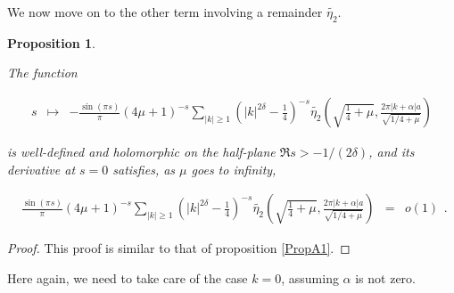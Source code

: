\documentclass{jams-l}
\newtheorem{proposition}[theorem]{Proposition}
\theoremstyle{definition}
\theoremstyle{remark}
\numberwithin{equation}{section}
\begin{document}
            We now move on to the other term involving a remainder $\widetilde{\eta_2}$.
            
            \begin{proposition}
            \label{PropA2}
            
                The function
                
                \[ \begin{array}{lll}
                        s & \longmapsto & - \frac{\sin \left( \pi s \right)}{\pi} \left( 4 \mu + 1 \right)^{-s} \sum\limits_{\left \vert k \right \vert \geqslant 1} \left( \left \vert k \right \vert^{2 \delta} - \frac{1}{4} \right)^{-s} \widetilde{\eta_2} \left( \sqrt{\frac{1}{4} + \mu}, \frac{2 \pi \left \vert k + \alpha \right \vert a}{\sqrt{1/4 + \mu}} \right)
                    \end{array} \]
                
                \noindent is well-defined and holomorphic on the half-plane $\Re s > - 1 / \left( 2 \delta \right)$, and its derivative at $s=0$ satisfies, as $\mu$ goes to infinity,
                
                \[ \begin{array}{lll}
                        \frac{\sin \left( \pi s \right)}{\pi} \left( 4 \mu + 1 \right)^{-s} \sum\limits_{\left \vert k \right \vert \geqslant 1} \left( \left \vert k \right \vert^{2 \delta} - \frac{1}{4} \right)^{-s} \widetilde{\eta_2} \left( \sqrt{\frac{1}{4} + \mu}, \frac{2 \pi \left \vert k + \alpha \right \vert a}{\sqrt{1/4 + \mu}} \right) & = & o \left( 1 \right)
                    \end{array} . \]
            
            \end{proposition}
            
            \begin{proof}
            
                This proof is similar to that of proposition \ref{PropA1}.
            
            \end{proof}
            
            Here again, we need to take care of the case $k = 0$, assuming $\alpha$ is not zero.
            
\end{document}

